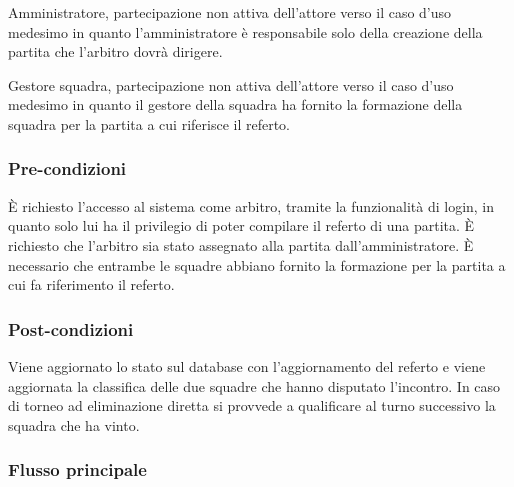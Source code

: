 Amministratore, partecipazione non attiva dell'attore verso il caso d'uso medesimo in quanto l'amministratore è responsabile solo della creazione della partita che l'arbitro dovrà dirigere.

Gestore squadra, partecipazione non attiva dell'attore verso il caso d'uso medesimo in quanto il gestore della squadra ha fornito la formazione della squadra per la partita a cui riferisce il referto.

\subsubsection*{Pre-condizioni}
È richiesto l'accesso al sistema come arbitro, tramite la funzionalità di login, in quanto solo lui ha il privilegio di poter compilare il referto di una partita. È richiesto che l'arbitro sia stato assegnato alla partita dall'amministratore. È necessario che entrambe le squadre abbiano fornito la formazione per la partita a cui fa riferimento il referto.

\subsubsection*{Post-condizioni}
Viene aggiornato lo stato sul database con l'aggiornamento del referto e viene aggiornata la classifica delle due squadre che hanno disputato l'incontro. In caso di torneo ad eliminazione diretta si provvede a qualificare al turno successivo la squadra che ha vinto.

\subsubsection*{Flusso principale}

